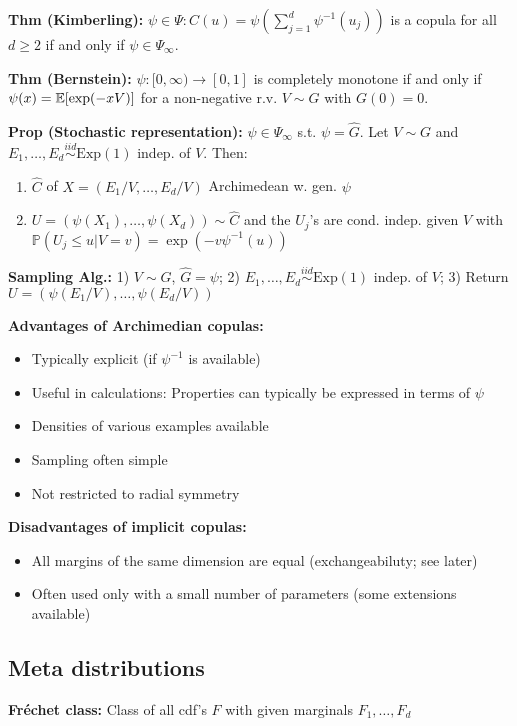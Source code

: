 \textbf{Thm (Kimberling):} $\psi\in\Psi: C(u)=\psi(\sum^d_{j=1}\psi^{-1}(u_j))$ is a copula for all $d\geq 2$ if and only if $\psi\in\Psi_\infty$.

\textbf{Thm (Bernstein):} $\psi:[0,\infty)\rightarrow [0,1]$ is completely monotone if and only if
$\psi(x)=\mathbb{E}[\exp(-xV)]$ for a non-negative r.v. $V\sim G$ with $G(0)=0$.

\textbf{Prop (Stochastic representation):} $\psi\in\Psi_\infty$ s.t. $\psi=\hat G$. Let $V\sim G$ and $E_1,\dots,E_d\stackrel{iid}{\sim}\text{Exp}(1)$ indep. of $V$. Then:
\begin{enumerate}
    \item $\hat C$ of $X=(E_1/V,\dots,E_d/V)$ Archimedean w. gen. $\psi$
    \item $U=(\psi(X_1), \dots, \psi(X_d))\sim\hat C$ and the $U_j$'s are cond. indep. given $V$ with $\mathbb{P}(U_j\leq u|V=v)=\exp(-v\psi^{-1}(u))$
\end{enumerate}

\textbf{Sampling Alg.:} 1) $V\sim G$, $\hat{G}=\psi$; 2) $E_1,\dots,E_d\stackrel{iid}{\sim}\text{Exp}(1)$ indep. of $V$; 3) Return $U=(\psi(E_1/V),\dots,\psi(E_d/V))$ 

\textbf{Advantages of Archimedian copulas:}
\begin{itemize}
    \item Typically explicit (if $\psi^{-1}$ is available)
    \item Useful in calculations: Properties can typically be expressed in terms of $\psi$
    \item Densities of various examples available
    \item Sampling often simple
    \item Not restricted to radial symmetry
\end{itemize}

\textbf{Disadvantages of implicit copulas:}
\begin{itemize}
    \item All margins of the same dimension are equal (exchangeabiluty; see later)
    \item Often used only with a small number of parameters (some extensions available)
\end{itemize}

\subsection*{Meta distributions}

\textbf{Fréchet class:} Class of all cdf's $F$ with given marginals $F_1,\dots,F_d$

